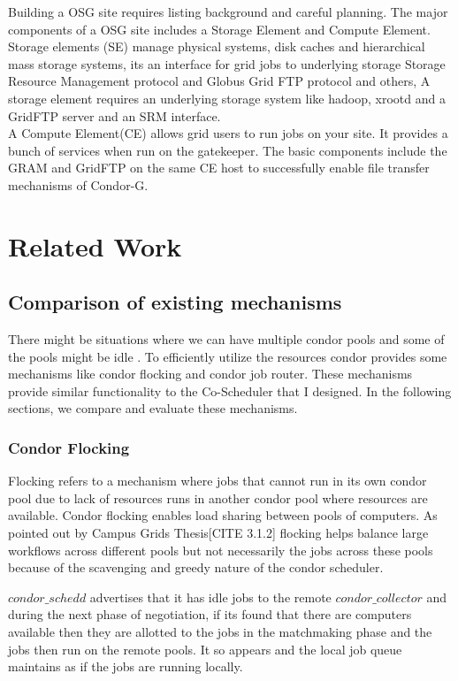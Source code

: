 \documentclass[ms,electronic,double]{nuthesis}
\begin{document}
Building a OSG site requires listing background and careful planning. The major 
components of a OSG site includes a Storage Element and Compute Element. \\

Storage elements (SE) manage physical systems, disk caches and hierarchical mass storage 
systems, its an interface for grid jobs to underlying storage Storage Resource Management protocol and Globus 
Grid FTP protocol and others, A storage element requires an underlying storage system like hadoop, xrootd
and a GridFTP server and an SRM interface.\\

A Compute Element(CE) allows grid users to run jobs on your site. It provides a 
bunch of services when run on the gatekeeper. The basic components include 
the GRAM and GridFTP on the same CE host to successfully enable file transfer 
mechanisms of Condor-G.\\


\chapter{Related Work}

\section{Comparison of existing mechanisms}
There might be situations where we can have multiple condor pools and some of 
the pools might be idle . To efficiently utilize the resources condor provides 
some mechanisms like condor flocking and condor job router. These mechanisms 
provide similar functionality to the Co-Scheduler that I designed. In the following sections, we compare 
and evaluate these mechanisms.

\subsection{Condor Flocking}
Flocking refers to a mechanism where jobs that cannot run in its own condor pool 
due to lack of resources runs in another condor pool where resources are 
available. Condor flocking enables load sharing between pools of computers. As 
pointed out by Campus Grids Thesis[CITE 3.1.2]  flocking helps balance large workflows across different pools but not 
necessarily the jobs across these pools because of the scavenging and greedy nature 
of the condor scheduler.

$condor\_schedd$ advertises that it has idle jobs to the remote $condor\_collector$ 
and during the next phase of negotiation, if its found that there are computers 
available then they are allotted to the jobs in the matchmaking phase and the 
jobs then run on the remote pools. It so appears and the local job queue maintains as if 
the jobs are running locally. 
\end{document}
